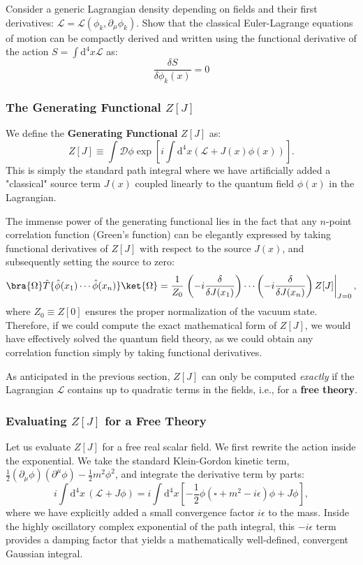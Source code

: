 \begin{example}[Exercise]
    Consider a generic Lagrangian density depending on fields and their first derivatives: $\mathcal{L} = \mathcal{L} (\phi_k, \partial_\mu \phi_k)$. Show that the classical Euler-Lagrange equations of motion can be compactly derived and written using the functional derivative of the action $S = \int \mathrm{d}^4 x \mathcal{L}$ as:
    \[
        \frac{\delta S}{\delta \phi_k(x)} = 0
    \]
\end{example}

\subsubsection{The Generating Functional $Z[J]$}

We define the \textbf{Generating Functional} $Z[J]$ as:
\[
    Z[J] \equiv \int \mathcal{D} \phi \exp\left[i \int \mathrm{d}^4 x \left( \mathcal{L} + J(x) \phi(x) \right)\right].
\]
This is simply the standard path integral where we have artificially added a "classical" source term $J(x)$ coupled linearly to the quantum field $\phi(x)$ in the Lagrangian.

The immense power of the generating functional lies in the fact that any $n$-point correlation function (Green's function) can be elegantly expressed by taking functional derivatives of $Z[J]$ with respect to the source $J(x)$, and subsequently setting the source to zero:
\[
    \bra{\Omega} \hat{T} \{\hat{\phi}(x_1) \cdots \hat{\phi} (x_n)\} \ket{\Omega} = \frac{1}{Z_0} \left. \left(-i\frac{\delta}{\delta J(x_1)}\right) \cdots \left(-i\frac{\delta}{\delta J(x_n)}\right) Z[J] \right|_{J=0},
\]
where $Z_0 \equiv Z[0]$ ensures the proper normalization of the vacuum state. Therefore, if we could compute the exact mathematical form of $Z[J]$, we would have effectively solved the quantum field theory, as we could obtain any correlation function simply by taking functional derivatives.

As anticipated in the previous section, $Z[J]$ can only be computed \textit{exactly} if the Lagrangian $\mathcal{L}$ contains up to quadratic terms in the fields, i.e., for a \textbf{free theory}.

\subsubsection{Evaluating $Z[J]$ for a Free Theory}

Let us evaluate $Z[J]$ for a free real scalar field. We first rewrite the action inside the exponential. We take the standard Klein-Gordon kinetic term, $\frac{1}{2}(\partial_\mu \phi)(\partial^\mu \phi) - \frac{1}{2}m^2\phi^2$, and integrate the derivative term by parts:
\[
    i \int \mathrm{d}^4 x \, \left( \mathcal{L} + J\phi \right) = i \int \mathrm{d}^4 x \left[ -\frac{1}{2} \phi (\square + m^2 - i \epsilon) \phi + J \phi \right],
\]
where we have explicitly added a small convergence factor $i \epsilon$ to the mass. Inside the highly oscillatory complex exponential of the path integral, this $-i\epsilon$ term provides a damping factor that yields a mathematically well-defined, convergent Gaussian integral.


